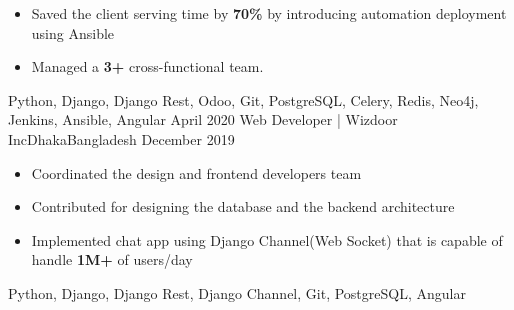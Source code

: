 \begin{experiences}
{\begin{itemize}
                           \item Saved the client serving time by \textbf{70\%} by introducing automation deployment using Ansible
                           \item Managed a \textbf{3+} cross-functional team.
                      \end{itemize}
                    }
                    {Python, Django, Django Rest, Odoo, Git, PostgreSQL, Celery, Redis, Neo4j, Jenkins, Ansible, Angular}
  \emptySeparator
  \experience
    {April 2020}     {Web Developer | Wizdoor Inc}{Dhaka}{Bangladesh}
    {December 2019}    {
                     \begin{itemize}
                         \item Coordinated the design and frontend developers team
                         \item Contributed for designing the database and the backend architecture
                         \item Implemented chat app using Django Channel(Web Socket) that is capable of handle \textbf{1M+} of users/day
                     \end{itemize}
                    }
                    { Python, Django, Django Rest, Django Channel, Git, PostgreSQL, Angular}
  \emptySeparator

\end{experiences}
